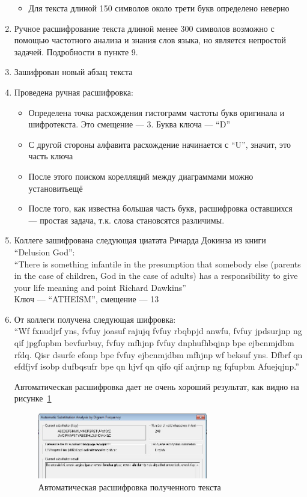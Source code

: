 \documentclass[a4paper, 14pt]{extarticle}
\begin{document}
\begin{enumerate}
\begin{itemize}
        \item Для текста длиной 150 символов около трети букв определено неверно
    \end{itemize}
    \item Ручное расшифрование текста длиной менее 300 символов возможно с помощью частотного анализа и знания слов языка, но является непростой задачей. Подробности в пункте 9.
    \item Зашифрован новый абзац текста
    \item Проведена ручная расшифровка:
    \begin{itemize}
        \item Определена точка расхождения гистограмм частоты букв оригинала и шифротекста. Это смещение --- 3. Буква ключа --- ``D''
        \item С другой стороны алфавита расхождение начинается с ``U'', значит, это часть ключа
        \item После этого поиском корелляций между диаграммами можно установитьещё 
        \item После того, как известна большая часть букв, расшифровка оставшихся --- простая задача, т.к. слова становсятся различимы.
    \end{itemize}
    \item Коллеге зашифрована следующая циатата Ричарда Докинза из книги ``Delusion God'': \\
    ``There is something infantile in the presumption that somebody else (parents in the case of children, God in the case of adults) has a responsibility to give your life meaning and point
Richard Dawkins''\\
    Ключ --- ``ATHEISM'', смещение --- 13
    \item От коллеги получена следующая шифровка:\\
    ``Wf fxnudjrf yns, fvfuy joasuf rajujq fvfuy rbqbpjd anwfu, fvfuy jpdsurjnp ng qif jpgfupbm bevfurbuy, fvfuy mfhjnp fvfuy dnphufhbqjnp bpe ejbcnmjdbm rfdq. Qisr dsurfe efonp bpe fvfuy ejbcnmjdbm mfhjnp wf beksuf yns. Dfbrf qn efdfjvf isobp dufbqsufr bpe qn hjvf qn qifo qif anjrnp ng fqfupbm Afuejqjnp.''
    
    Автоматическая расшифровка дает не очень хороший результат, как видно на рисунке~\ref{img:1:5}
    \begin{figure}[h]
        \centering
        \includegraphics[width=0.7\textwidth]{./img/S005.jpg}
        \caption{Автоматическая расшифровка полученного текста}%
        \label{img:1:5}
    \end{figure}


\end{enumerate}
\end{document}
